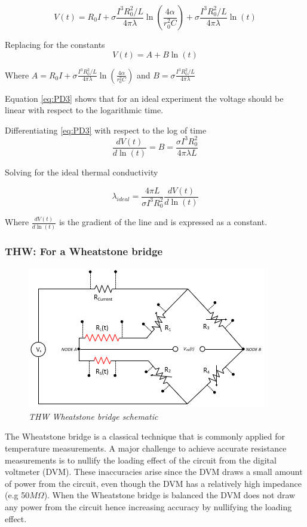 \documentclass{article}
\begin{document}
	\begin{equation} \label{eq:PD3}
V(t) = R_0 I + \sigma \frac{I^3R_0^2/L}{4 \pi \lambda} \ln \left( \frac{4 \alpha } {r^2_0 C}\right) + \sigma \frac{I^3R_0^2/L}{4 \pi \lambda} \ln \left( t \right)
	\end{equation}

Replacing for the constants 
	\begin{equation} \label{eq:PD3}
V(t) = A + B \ln \left( t \right)
	\end{equation}

Where $ A =  R_0 I + \sigma \frac{I^3R_0^2/L}{4 \pi \lambda} \ln \left( \frac{4 \alpha } {r^2_0 C}\right) $ and $ B = \sigma \frac{I^3R_0^2/L}{4 \pi \lambda}$

Equation \ref{eq:PD3} shows that for an ideal experiment the voltage should be linear with respect to the logarithmic time.

Differentiating \ref{eq:PD3} with respect to the log of time
$$\frac{dV(t)}{d \ln (t)} = B = \frac{\sigma I^3R_0^2}{4 \pi \lambda L}$$

Solving for the ideal thermal conductivity

$$ \lambda_{ideal}= \frac{4 \pi L}{\sigma I^3R_0^2} \frac{dV(t)}{d \ln (t)} $$

Where $\frac{dV(t)}{d \ln (t)} $ is the gradient of the line and is expressed as a constant.

\subsubsection{THW: For a Wheatstone bridge}

	\begin{figure}[h]
		\centering
		\includegraphics[scale=0.7]{WBPIC3}
		\caption{\textit{THW Wheatstone bridge schematic}}
		\label{fig:pcbdesign}
	\end{figure}

The Wheatstone bridge is a classical technique that is commonly applied for temperature measurements. A major challenge to achieve accurate resistance measurements is to nullify the loading effect of the circuit from the digital voltmeter (DVM). These inaccuracies arise since the DVM draws a small amount of power from the circuit, even though the DVM has a relatively high impedance (e.g 50$M\Omega$). When the Wheatstone bridge is balanced the DVM does not draw any power from the circuit hence increasing accuracy by nullifying the loading effect. 
\end{document}
